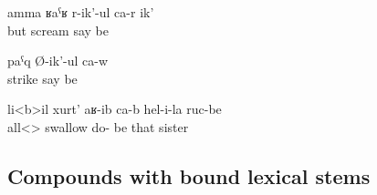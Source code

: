 %
\begin{exe}
	\ex	\label{ex:But she is screaming}
	\gll	amma	ʁaˁʁ	r-ik'-ul	ca-r	ik'\\
		but	scream	say	be	\\
	\glt	{}

	\ex	\label{ex:(He) is beating}
	\gll	paˁq	Ø-ik'-ul	ca-w\\
		strike	say	be\\
	\glt	{}

	\ex	\label{ex:(The wolf) swallowed all her sisters}
	\gll	li<b>il	xurt'	aʁ-ib	ca-b	hel-i-la	ruc-be\\
		all<>	swallow	do- be	that	sister\\
	\glt	{}
\end{exe}



\subsection{Compounds with bound lexical stems}
\label{ssec:compoundswithboundroots}

